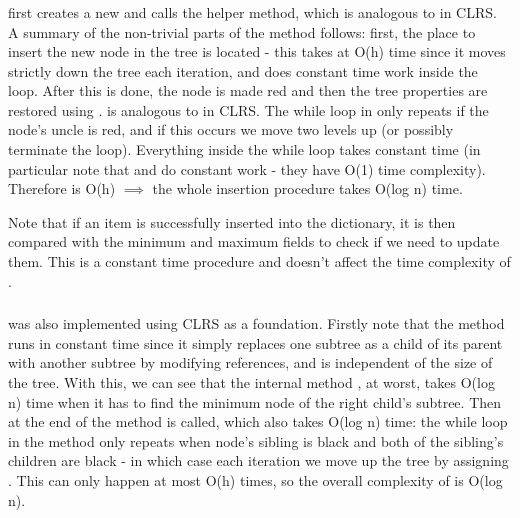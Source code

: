 \subsubsection{}
 first creates a new  and calls the  helper method, which is analogous to  in CLRS. A summary of the non-trivial parts of the method follows:
first, the place to insert the new node in the tree is located - this takes at O(h) time since it moves strictly down the tree each iteration, and does constant time work inside the loop. After this is done, the node is made red and then the tree properties are restored using .  is analogous to  in CLRS. The while loop in  only repeats if the node's uncle is red, and if this occurs we move two levels up (or possibly terminate the loop). Everything inside the while loop takes constant time (in particular note that  and  do constant work - they have O(1) time complexity). Therefore  is O(h) $\implies$ the whole insertion procedure takes O(log n) time.

Note that if an item is successfully inserted into the dictionary, it is then compared with the minimum and maximum fields to check if we need to update them. This is a constant time procedure and doesn't affect the time complexity of . 

\subsubsection{}
 was also implemented using CLRS as a foundation. Firstly note that the  method runs in constant time since it simply replaces one subtree as a child of its parent with another subtree by modifying references, and is independent of the size of the tree. With this, we can see that the internal method , at worst, takes O(log n) time when it has to find the minimum node of the right child's subtree. Then at the end of the method  is called, which also takes O(log n) time: the while loop in the method only repeats when node's sibling is black and both of the sibling's children are black - in which case each iteration we move up the tree by assigning . This can only happen at most O(h) times, so the overall complexity of  is O(log n).

